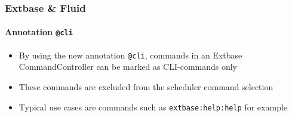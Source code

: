 \begin{frame}[fragile]
	\frametitle{Extbase \& Fluid}
	\framesubtitle{Annotation \texttt{@cli}}

	\begin{itemize}

		\item By using the new annotation \texttt{@cli}, commands in an Extbase
			CommandController can be marked as CLI-commands only

		\item These commands are excluded from the scheduler command selection

		\item Typical use cases are commands such as \texttt{extbase:help:help} for example

	\end{itemize}

\end{frame}

